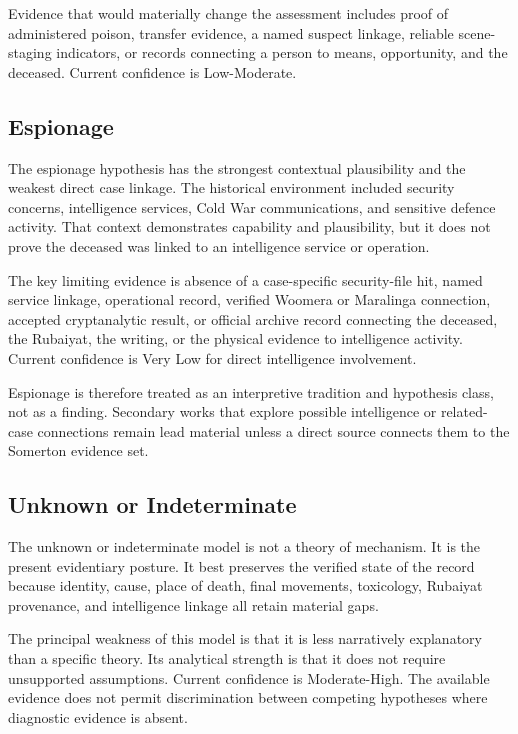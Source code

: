 Evidence that would materially change the assessment includes proof of administered poison, transfer evidence, a named suspect linkage, reliable scene-staging indicators, or records connecting a person to means, opportunity, and the deceased. Current confidence is Low-Moderate.

\subsection{Espionage}

The espionage hypothesis has the strongest contextual plausibility and the weakest direct case linkage. The historical environment included security concerns, intelligence services, Cold War communications, and sensitive defence activity. That context demonstrates capability and plausibility, but it does not prove the deceased was linked to an intelligence service or operation.

The key limiting evidence is absence of a case-specific security-file hit, named service linkage, operational record, verified Woomera or Maralinga connection, accepted cryptanalytic result, or official archive record connecting the deceased, the Rubaiyat, the writing, or the physical evidence to intelligence activity. Current confidence is Very Low for direct intelligence involvement.

Espionage is therefore treated as an interpretive tradition and hypothesis class, not as a finding. Secondary works that explore possible intelligence or related-case connections remain lead material unless a direct source connects them to the Somerton evidence set.

\subsection{Unknown or Indeterminate}

The unknown or indeterminate model is not a theory of mechanism. It is the present evidentiary posture. It best preserves the verified state of the record because identity, cause, place of death, final movements, toxicology, Rubaiyat provenance, and intelligence linkage all retain material gaps.

The principal weakness of this model is that it is less narratively explanatory than a specific theory. Its analytical strength is that it does not require unsupported assumptions. Current confidence is Moderate-High. The available evidence does not permit discrimination between competing hypotheses where diagnostic evidence is absent.

